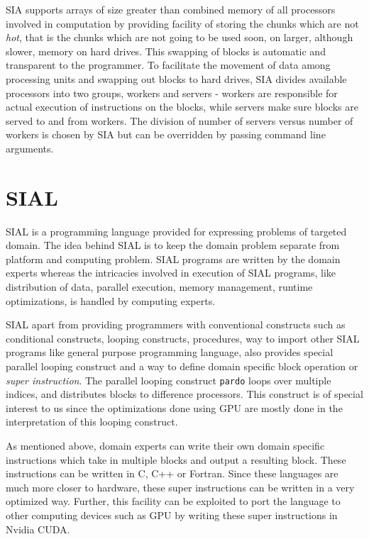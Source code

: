 SIA supports arrays of size greater than combined memory of all processors
involved in computation by providing facility of storing the chunks which are
not \textit{hot}, that is the chunks which are not going to be used soon, on
larger, although slower, memory on hard drives. This swapping of blocks is automatic
and transparent to the programmer. To facilitate the movement of data among
processing units and swapping out blocks to hard drives, SIA divides available
processors into two groups, workers and servers - workers are responsible for
actual execution of instructions on the blocks, while servers make sure blocks
are served to and from workers. The division of number of servers versus number
of workers is chosen by SIA but can be overridden by passing command line
arguments.

\section{SIAL}
SIAL is a programming language provided for expressing problems of targeted
domain. The idea behind SIAL is to keep the domain problem separate from
platform and computing problem. SIAL programs are written by the domain experts
whereas the intricacies involved in execution of SIAL programs, like distribution of
data, parallel execution, memory management, runtime optimizations, is handled
by computing experts.

SIAL apart from providing programmers with conventional constructs such as
conditional constructs, looping constructs, procedures, way to import other SIAL
programs like general purpose programming language, also provides special parallel looping construct and a way
to define domain specific block operation or \textit{super instruction}. The
parallel looping construct \texttt{pardo} loops over multiple indices, and
distributes blocks to difference processors. This construct is of special
interest to us since the optimizations done using GPU are mostly done in the
interpretation of this looping construct.

As mentioned above, domain experts can write their own domain specific
instructions which take in multiple blocks and output a resulting block. These
instructions can be written in C, C++ or Fortran. Since these languages are much
more closer to hardware, these super instructions can be written in a very
optimized way. Further, this facility can be exploited to port the language to
other computing devices such as GPU by writing these super instructions in
Nvidia CUDA.

